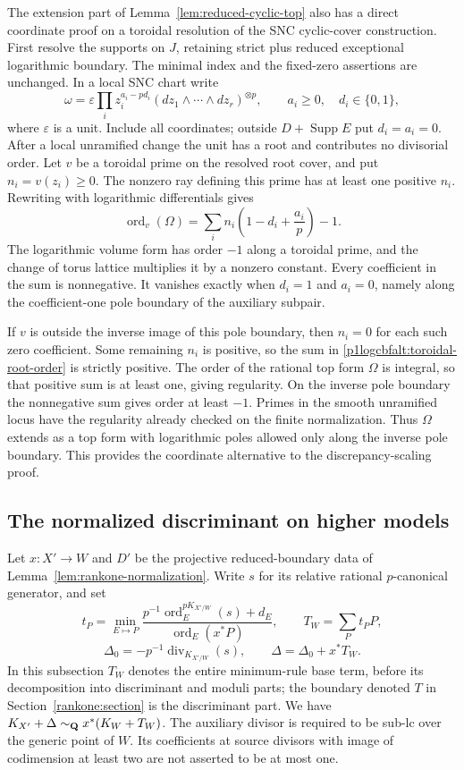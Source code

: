 The extension part of Lemma~\ref{lem:reduced-cyclic-top} also has a
direct coordinate proof on a toroidal resolution of the SNC
cyclic-cover construction. First resolve the supports on $J$,
retaining strict plus reduced exceptional logarithmic boundary.
The minimal index and the fixed-zero assertions are unchanged.
In a local SNC chart write
\[
 \omega=\varepsilon\prod_i z_i^{a_i-pd_i}
                (dz_1\wedge\cdots\wedge dz_r)^{\otimes p},
 \qquad a_i\ge0,\quad d_i\in\{0,1\},
\]
where $\varepsilon$ is a unit. Include all coordinates; outside
$D+\operatorname{Supp}E$ put $d_i=a_i=0$. After a local unramified
change the unit has a root and contributes no divisorial order.
Let $v$ be a toroidal prime on the resolved root cover, and put
$n_i=v(z_i)\ge0$. The nonzero ray defining this prime has at least
one positive $n_i$. Rewriting with logarithmic differentials gives
\begin{equation}\label{p1logcbfalt:toroidal-root-order}
 \operatorname{ord}_v(\Omega)
   =\sum_i n_i\left(1-d_i+\frac{a_i}{p}\right)-1.
\end{equation}
The logarithmic volume form has order $-1$ along a toroidal prime,
and the change of torus lattice multiplies it by a nonzero constant.
Every coefficient in the sum is nonnegative. It vanishes exactly
when $d_i=1$ and $a_i=0$, namely along the coefficient-one pole
boundary of the auxiliary subpair.

If $v$ is outside the inverse image of this pole boundary, then
$n_i=0$ for each such zero coefficient. Some remaining $n_i$ is
positive, so the sum in \eqref{p1logcbfalt:toroidal-root-order} is
strictly positive. The order of the rational top form $\Omega$ is
integral, so that positive sum is at least one, giving regularity.
On the inverse pole boundary the nonnegative sum gives order at
least $-1$. Primes in the smooth unramified locus have the
regularity already checked on the finite normalization. Thus
$\Omega$ extends as a top form with logarithmic poles allowed only
along the inverse pole boundary. This provides the coordinate
alternative to the discrepancy-scaling proof.

\subsection{The normalized discriminant on higher models}

Let $x:X'\to W$ and $D'$ be the projective reduced-boundary
data of Lemma~\ref{lem:rankone-normalization}. Write $s$ for its
relative rational $p$-canonical generator, and set
\[
 t_P=\min_{E\mapsto P}
 \frac{p^{-1}\operatorname{ord}^{pK_{X'/W}}_E(s)+d_E}
 {\operatorname{ord}_E(x^*P)},\qquad
 T_W=\sum_Pt_PP,
\]
\[
 \Delta_0=-p^{-1}\operatorname{div}_{K_{X'/W}}(s),
 \qquad \Delta=\Delta_0+x^*T_W.
\]
In this subsection $T_W$ denotes the entire minimum-rule base
term, before its decomposition into discriminant and moduli parts;
the boundary denoted $T$ in Section~\ref{rankone:section} is the
discriminant part. We have
$K_{X'}+\Delta\sim_{\mathbf Q}x^*(K_W+T_W)$.
The auxiliary divisor is required to be sub-lc over the generic
point of $W$. Its coefficients at source divisors with image of
codimension at least two are not asserted to be at most one.

